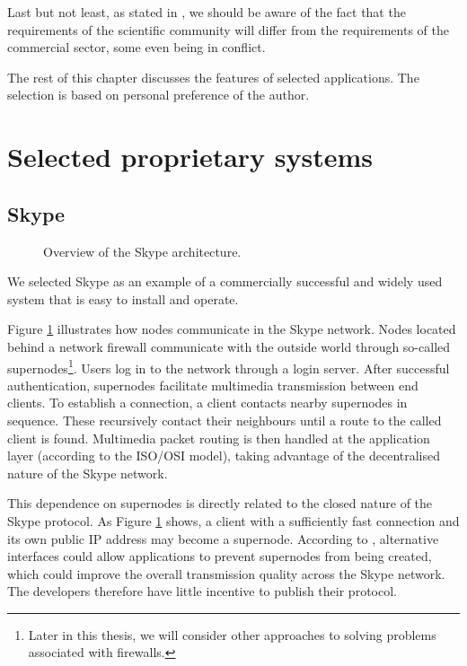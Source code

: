 Last but not least, as stated in \cite{OpenMashProject}, we should be aware of the fact that the requirements of the scientific community will differ from the requirements of the commercial sector, some even being in conflict.

The rest of this chapter discusses the features of selected applications. The selection is based on personal preference of the author.

\section{Selected proprietary systems}

\subsection{Skype}\label{kap:Skype}
\begin{figure}
\centering

\caption{Overview of the Skype architecture.}
\label{fig:Skype-Architecture}
\end{figure}

We selected Skype as an example of a commercially successful and widely used system that is easy to install and operate.

Figure \ref{fig:Skype-Architecture} illustrates how nodes communicate in the Skype network. Nodes located behind a network firewall communicate with the outside world through so-called supernodes\footnote{Later in this thesis, we will consider other approaches to solving problems associated with firewalls.}. Users log in to the network through a login server. After successful authentication, supernodes facilitate multimedia transmission between end clients. To establish a connection, a client contacts nearby supernodes in sequence. These recursively contact their neighbours until a route to the called client is found. Multimedia packet routing is then handled at the application layer (according to the ISO/OSI model), taking advantage of the decentralised nature of the Skype network.

This dependence on supernodes is directly related to the closed nature of the Skype protocol. As Figure \ref{fig:Skype-Architecture} shows, a client with a sufficiently fast connection and its own public IP address may become a supernode. According to \cite{ArticleUreliable-Root-10-duvodu-proc-nepouzivat-skype}, alternative interfaces could allow applications to prevent supernodes from being created, which could improve the overall transmission quality across the Skype network. The developers therefore have little incentive to publish their protocol.

